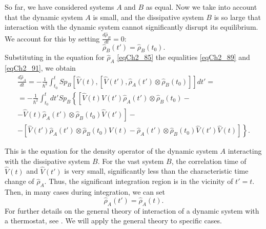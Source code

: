 So far, we have considered systems $A$ and $B$ as equal. Now we take into account that the dynamic system $A$ is small, and the dissipative system $B$ is so large that interaction with the dynamic system cannot significantly disrupt its equilibrium. We account for this by setting $\frac{d \hat{\rho}_B}{d t} = 0$: 
\begin{equation}
\hat{\rho}_B\left(t'\right) =
\hat{\rho}_B\left(t_0\right).
\label{eqCh2_92}
\end{equation}
Substituting in the equation for $\hat{\rho}_A$ \eqref{eqCh2_85} the equalities \eqref{eqCh2_89} and \eqref{eqCh2_91}, we obtain 
\begin{eqnarray}
\frac{d \hat{\rho}_A}{d t} = - \frac{1}{\hbar^2}
\int_{t_0}^t Sp_B\left[
\hat{V}\left(t\right),
\left[
\hat{V}\left(t'\right),
\hat{\rho}_A\left(t'\right) \otimes
\hat{\rho}_B\left(t_0\right)
\right]
\right]dt' = 
\nonumber \\ 
=
- \frac{1}{\hbar^2}
\int_{t_0}^t d t' Sp_B\left\{
\left[
\hat{V}\left(t\right)
\hat{V}\left(t'\right)
\hat{\rho}_A\left(t'\right) \otimes
\hat{\rho}_B\left(t_0\right) -
\right.
\right.
\nonumber \\
-
\left.
\left.
\hat{V}\left(t\right)
\hat{\rho}_A\left(t'\right) \otimes
\hat{\rho}_B\left(t_0\right)
\hat{V}\left(t'\right)
\right] - 
\right.
\nonumber \\
-
\left.
\left[
\hat{V}\left(t'\right)
\hat{\rho}_A\left(t'\right) \otimes
\hat{\rho}_B\left(t_0\right)
\hat{V}\left(t\right)
-
\hat{\rho}_A\left(t'\right) \otimes
\hat{\rho}_B\left(t_0\right)
\hat{V}\left(t'\right)\hat{V}\left(t\right) 
\right]
\right\}.
\label{eqCh2_93}
\end{eqnarray}

This is the equation for the density operator of the dynamic system $A$ interacting with the dissipative system $B$. For the vast system $B$, the correlation time of $\hat{V}\left(t\right)$ and $\hat{V}\left(t'\right)$ is very small, significantly less than the characteristic time change of $\hat{\rho}_A$. Thus, the significant integration region is in the vicinity of $t' = t$. Then, in many cases during integration, we can set
\[
\hat{\rho}_A\left(t'\right) =
\hat{\rho}_A\left(t\right).
\]
For further details on the general theory of interaction of a dynamic system with a thermostat, see \cite{bLaks1974}. We will apply the general theory to specific cases.